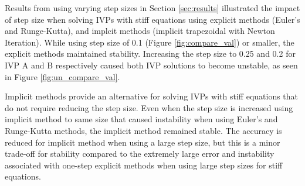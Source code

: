 \documentclass{article}
\begin{document}
Results from using varying step sizes in Section \ref{sec:results} illustrated the impact of step size when solving IVPs with stiff equations using explicit methods (Euler's and Runge-Kutta), and implcit methods (implicit trapezoidal with Newton Iteration). While using step size of 0.1 (Figure \ref{fig:compare_val}) or smaller, the explicit methods maintained stability. Increasing the step size to 0.25 and 0.2 for IVP A and B respectively caused both IVP solutions to become unstable, as seen in Figure \ref{fig:un_compare_val}.

Implicit methods provide an alternative for solving IVPs with stiff equations that do not require reducing the step size. Even when the step size is increased using implicit method to same size that caused instability when using Euler's and Runge-Kutta methods, the implicit method remained stable. The accuracy is reduced for implicit method when using a large step size, but this is a minor trade-off for stability compared to the extremely large error and instability associated with one-step explicit methods when using large step sizes for stiff equations.
\end{document}
